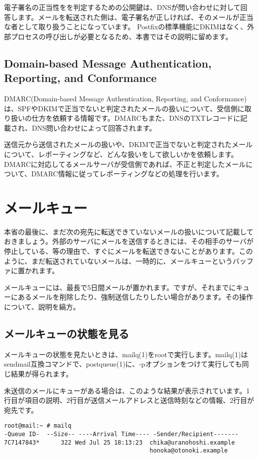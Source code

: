 {電子署名の正当性をを判定するための公開鍵は、DNSが問い合わせに対して回答します。メールを転送された側は、電子署名が正しければ、そのメールが正当な者として取り扱うことになっています。
Postfixの標準機能にDKIMはなく、外部プロセスの呼び出しが必要となるため、本書ではその説明に留めます。

\subsection{Domain-based Message Authentication, Reporting, and Conformance}
DMARC(Domain-based Message Authentication, Reporting, and Conformance)は、SPFやDKIMで正当でないと判定されたメールの扱いについて、受信側に取り扱いの仕方を依頼する情報です。DMARCもまた、DNSのTXTレコードに記載され、DNS問い合わせによって回答されます。

送信元から送信されたメールの扱いや、DKIMで正当でないと判定されたメールについて、レポーティングなど、どんな扱いをして欲しいかを依頼します。
DMARCに対応してるメールサーバが受信側であれば、不正と判定したメールについて、DMARC情報に従ってレポーティングなどの処理を行います。


\section{メールキュー}

本省の最後に、まだ次の宛先に転送できていないメールの扱いについて記載しておきましょう。外部のサーバにメールを送信するときには、その相手のサーバが停止している、等の理由で、すぐにメールを転送できないことがあります。このように、まだ転送されていないメールは、一時的に、メールキューというバッファに置かれます。

メールキューには、最長で5日間メールが置かれます。ですが、それまでにキューにあるメールを削除したり、強制送信したりしたい場合があります。その操作について、説明を縞方。

\subsection{メールキューの状態を見る}
メールキューの状態を見たいときは、mailq(1)をrootで実行します。mailq(1)はsendmail互換コマンドで、postqueue(1)に、-pオプションをつけて実行しても同じ結果が得られます。

未送信のメールにキューがある場合は、このような結果が表示されています。1行目が項目の説明、2行目が送信メールアドレスと送信時刻などの情報、2行目が宛先です。

\begin{verbatim}
root@mail:~ # mailq
-Queue ID-  --Size-- ----Arrival Time---- -Sender/Recipient-------
7C7147843*      322 Wed Jul 25 18:13:23  chika@uranohoshi.example
                                         honoka@otonoki.example



\end{verbatim}}
